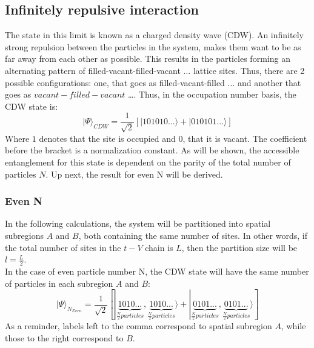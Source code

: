 	\subsection{Infinitely repulsive interaction}
		The state in this limit is known as a charged density wave (CDW). An infinitely strong repulsion between the particles in the system, makes them want to be as far away from each other as possible. This results in the particles forming an alternating pattern of filled-vacant-filled-vacant $\dots$ lattice sites. Thus, there are 2 possible configurations: one, that goes as filled-vacant-filled $\dots$ and another that goes as $vacant-filled-vacant$ \dots. Thus, in the occupation number basis, the CDW state is:
%
\begin{equation}
| \Psi \rangle_{CDW} = \frac{1}{\sqrt{2}} [|101010... \rangle + |010101... \rangle ] 
\end{equation}
%
Where $1$ denotes that the site is occupied and $0$, that it is vacant. The coefficient before the bracket is a normalization constant. As will be shown, the accessible entanglement for this state is dependent on the parity of the total number of particles $N$. Up next, the result for even N will be derived.

	\subsubsection{Even N}
	In the following calculations, the system will be partitioned into spatial subregions $A$ and $B$, both containing the same number of sites. In other words, if the total number of sites in the $t-V$ chain is $L$, then the partition size will be $l=\frac{L}{2}$. \\
	
In the case of even particle number N, the CDW state will have the same number of particles in each subregion $A$ and $B$:
%
\begin{equation}
| \Psi \rangle_{N_{Even}} = \frac{1}{\sqrt{2}} [|\underbrace{1010...}_{\frac{N}{2} particles}, \underbrace{1010...}_{\frac{N}{2} particles} \rangle + |\underbrace{0101...}_{\frac{N}{2} particles}, \underbrace{0101...}_{\frac{N}{2} particles} \rangle ] 
\end{equation}
%
As a reminder, labels left to the comma correspond to spatial subregion $A$, while those to the right correspond to $B$.

